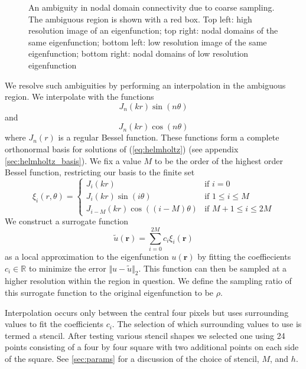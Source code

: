 \documentclass{report}
\newcommand{\rr}[0]{\mathbf{r}}
\begin{document}
\begin{figure}
\begin{center}
    \caption{An ambiguity in nodal domain connectivity due to coarse sampling. The ambiguous region is shown with a red box. Top left: high resolution image of an eigenfunction; top right: nodal domains of the same eigenfunction; bottom left: low resolution image of the same eigenfunction; bottom right: nodal domains of low resolution eigenfunction}
    \label{fig:interpolation_sample}
  \end{center}
\end{figure}

We resolve such ambiguities by performing an interpolation in the ambiguous region. We interpolate with the functions
\[
J_{n}(k r) \sin(n \theta)
\]
and
\[
J_{n}(k r) \cos(n \theta)
\]
where $J_{n}(r)$ is a regular Bessel function. These functions form a complete orthonormal basis for solutions of (\ref{eq:helmholtz}) (see appendix \ref{sec:helmholtz_basis}). We fix a value $M$ to be the order of the highest order Bessel function, restricting our basis to the finite set
\begin{equation}
  \label{eq:interp_functions}
  \xi_{i}(r, \theta)=\begin{cases}
  J_{i}(k r) & \text{if }i=0\\
  J_{i}(k r)\sin(i\theta) & \text{if }1 \le i \le M\\
  J_{i-M}(k r)\cos((i-M)\theta) & \text{if }M+1 \le i \le 2M
  \end{cases}
\end{equation}
We construct a surrogate function
\[
  \tilde{u}(\rr) = \sum_{i=0}^{2M} c_{i} \xi_{i}(\rr)
\]
as a local approximation to the eigenfunction $u(\rr)$ by fitting the coeffiecients $c_{i} \in \mathbb{R}$ to minimize the error $\Vert u - \tilde{u} \Vert_{2}$. This function can then be sampled at a higher resolution within the region in question. We define the sampling ratio of this surrogate function to the original eigenfunction to be $\rho$.

Interpolation occurs only between the central four pixels but uses surrounding values to fit the coefficients $c_i$. The selection of which surrounding values to use is termed a stencil. After testing various stencil shapes we selected one using 24 points consisting of a four by four square with two additional points on each side of the square. See \ref{sec:params} for a discussion of the choice of stencil, $M$, and $h$.
\end{document}
